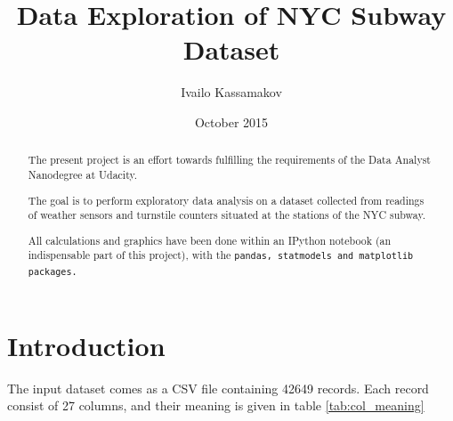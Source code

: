 \documentclass{article}
\title{Data Exploration of NYC Subway Dataset}
\author{Ivailo Kassamakov}
\date{October 2015}
\begin{document}
\maketitle
\begin{abstract}
The present project is an effort towards fulfilling the requirements of the Data Analyst Nanodegree at Udacity.

The goal is to perform exploratory data analysis on a dataset collected from readings of weather sensors and turnstile counters situated at the stations of the NYC subway.

All calculations and graphics have been done within an IPython notebook (an indispensable part of this project), with the \tt pandas\rm, statmodels \rm and \tt matplotlib \rm packages.
\end{abstract}

\section{Introduction}

The input dataset comes as a CSV file containing 42649 records. Each record consist of 27 columns, and their meaning is given in table \ref{tab:col_meaning}
\end{document}
